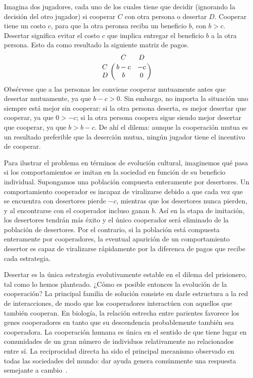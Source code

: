 \documentclass[a4paper,10pt]{book}
\begin{document}

Imagina dos jugadores, cada uno de los cuales tiene que decidir (ignorando la decisión del otro jugador) si cooperar $C$ con otra persona o desertar $D$.
Cooperar tiene un costo $c$, para que la otra peronsa reciba un beneficio $b$, con $b > c$.
Desertar significa evitar el costo $c$ que implica entregar el beneficio $b$ a la otra persona.
Esto da como resultado la siguiente matriz de pagos.
\begin{equation}
    \bordermatrix{ & C & D \cr
      C & b-c & -c \cr
      D & b & 0  } 
\end{equation}
Obsérvese que a las personas les conviene cooperar mutuamente antes que desertar mutuamente, ya que $b - c > 0$.
Sin embargo, no importa la situación uno siempre está mejor sin cooperar: si la otra persona deserta, es mejor desertar que cooperar, ya que $0 > -c$; si la otra persona coopera sigue siendo mejor desertar que cooperar, ya que $b > b - c$.
De ahí el dilema: aunque la cooperación mutua es un resultado preferible que la deserción mutua, ningún jugador tiene el incentivo de cooperar.


Para ilustrar el problema en términos de evolución cultural, imaginemos qué pasa si los comportamientos se imitan en la sociedad en función de su beneficio individual.
Supongamos una población compuesta enteramente por desertores.
Un comportamiento cooperador es incapaz de viralizarse debido a que cada vez que se encuentra con desertores pierde $-c$, mientras que los desertores nunca pierden, y al encontrarse con el cooperador incluso ganan $b$.
Así en la etapa de imitación, los desertores tendrán más éxito y el único cooperador será eliminado de la población de desertores.
Por el contrario, si la población está compuesta enteramente por cooperadores, la eventual aparición de un comportamiento desertor es capaz de viralizarse rápidamente por la diferenca de pagos que recibe cada estrategia.


Desertar es la única estrategia evolutivamente estable en el dilema del prisionero, tal como lo hemos planteado.
¿Cómo es posible entonces la evolución de la cooperación?
La principal familia de solución consiste en darle estructura a la red de interacciones, de modo que los cooperadores interactúen con aquellos que también cooperan.
En biología, la relación estrecha entre parientes favorece los genes cooperadores en tanto que su descendencia probablemente también sea cooperadora.
La cooperación humana es única en el sentido de que tiene lugar en comunidades de un gran número de individuos relativamente no relacionados entre sí.
La reciprocidad directa ha sido el principal mecanismo observado en todas las sociedades del mundo: dar ayuda genera comúnmente una respuesta semejante a cambio~\cite{donMauss}.
\end{document}

